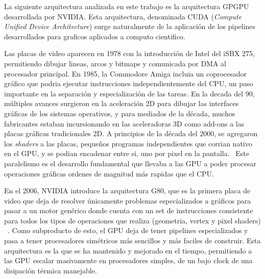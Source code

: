 La siguiente arquitectura analizada en este trabajo es la arquitectura GPGPU desarrollada por NVIDIA.
Esta arquitectura, denominada CUDA (\textit{Compute Unified Device Architecture}) surge naturalmente de la aplicaci\'on de los pipelines desarrollados para
graficos aplicados a computo cientifico.

Las placas de video aparecen en 1978 con la introducci\'on de Intel del iSBX 275, permitiendo dibujar lineas,
arcos y bitmaps y comunicada por DMA al procesador principal. En 1985, la Commodore Amiga incluia un coprocesador
gr\'afico que podria ejecutar instrucciones independientemente del CPU, un paso importante en la separaci\'on
y especializaci\'on de las tareas. En la decada del 90, m\'ultiples
avances surgieron en la aceleraci\'on 2D para dibujar las interfaces gr\'aficas de los sistemas operativos,
y para mediados de la d\'ecada, muchos fabricantes estaban incursionando en las aceleradoras 3D como
add-ons a las placas gr\'aficas tradicionales 2D. A principios de la d\'ecada del 2000, se agregaron los
\textit{shaders} a las placas, peque\~nos programas independientes que corrian nativo en el GPU,
y se podian encadenar entre si, uno por pixel en la pantalla.~\cite{CG} Este paralelismo es el desarrollo fundamental
que llevaba a las GPU a poder procesar operaciones gr\'aficas ordenes de magnitud m\'as rapidas que el CPU.

En el 2006, NVIDIA introduce la arquitectura G80,
que es la primera placa de video que deja de resolver \'unicamente problemas especializados a gr\'aficos
para pasar a un motor gen\'erico donde cuenta con un set de instrucciones consistente para todos los
tipos de operaciones que realiza (geometria, vertex y pixel shaders) ~\cite{cudaHandbook}. Como subproducto de esto,
el GPU deja de tener pipelines especializados y pasa a tener procesadores sim\'etricos m\'as sencillos y m\'as
faciles de construir. Esta arquitectura es la que se ha mantenido y mejorado en el tiempo, permitiendo
a las GPU escalar masivamente en procesadores simples, de un bajo clock de una disipaci\'on t\'ermica
manejable.

